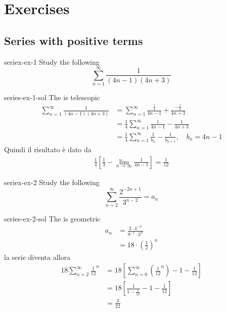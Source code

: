 \documentclass[preview]{standalone}
\begin{document}
\genpage

\section{Exercises}

\subsection{Series with positive terms}

\begin{snippetexercise}{seriex-ex-1}{}
    Study the following \series
    \[
        \sum_{n=1}^\infty \frac{1}{(4n-1)(4n+3)}
    \]
\end{snippetexercise}

\begin{snippetsolution}{series-ex-1-sol}{}
    The \series is telescopic
    \begin{align*}
        \sum_{n=1}^\infty \frac{1}{(4n-1)(4n+3)}
        &= \sum_{n=1}^\infty
        \frac{\frac{1}{4}}{4n-1} + \frac{-\frac{1}{4}}{4n+3} \\
        &= \frac{1}{4} \sum_{n=1}^\infty
        \frac{1}{4n-1} - \frac{1}{4n+3} \\
        &= \frac{1}{4} \sum_{n=1}^\infty
        \frac{1}{b_n} - \frac{1}{b_{n+1}}, \quad b_n = 4n-1 
    \end{align*}
    Quindi il risultato è dato da
    \begin{align*}
        \frac{1}{4} \left[
            \frac{1}{3} - \lim_{n\to \infty} \frac{1}{4n-1}
        \right] = \frac{1}{12}
    \end{align*}
\end{snippetsolution}

\begin{snippetexercise}{seriex-ex-2}{}
    Study the following \series
    \[
        \sum_{n=2}^\infty \frac{2^{-2n+1}}{3^{n-2}} = a_n
    \]
\end{snippetexercise}

\begin{snippetsolution}{series-ex-2-sol}{}
    The \series is geometric
    \begin{align*}
        a_n &= \frac{2 \cdot 4^{-n}}{9^{-1} \cdot 3^n} \\
        &= 18 \cdot {\left(\frac{1}{2}\right)}^n       
    \end{align*}
    la serie diventa allora
    \begin{align*}
        18 \sum_{n=2}^\infty {\frac{1}{12}}^n
        &= 18 \left[\sum_{n=0}^\infty \left({\frac{1}{12}}^n\right) - 1 - \frac{1}{12}\right]
        \\
        &= 18 \left[ \frac{1}{1 - \frac{1}{12}} - 1 - \frac{1}{12} \right] \\
        &= \frac{3}{22}
    \end{align*}
\end{snippetsolution}
\end{document}
